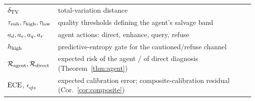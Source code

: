 \begin{table}[h]
\begin{tabular}{ll}
$\delta_{\mathrm{TV}}$ & total-variation distance \\
$\tau_{\mathrm{enh}},\tau_{\mathrm{high}},\tau_{\mathrm{low}}$ & quality thresholds defining the agent's salvage band \\
$a_d,a_e,a_q,a_r$ & agent actions: direct, enhance, query, refuse \\
$h_{\mathrm{high}}$ & predictive-entropy gate for the cautioned/refuse channel \\
$\mathcal{R}_{\mathrm{agent}},\mathcal{R}_{\mathrm{direct}}$ & expected risk of the agent / of direct diagnosis (Theorem~\ref{thm:agent}) \\
$\operatorname{ECE}$, $\epsilon_{\mathrm{qts}}$ & expected calibration error; composite-calibration residual (Cor.~\ref{cor:composite}) \\
\bottomrule
\end{tabular}
\end{table}
